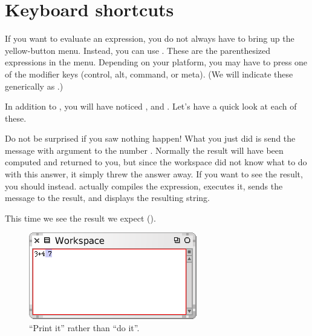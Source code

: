 \documentclass[a4paper,10pt,twoside]{book}
\begin{document}
\section{Keyboard shortcuts}

If you want  to evaluate an expression, you do not always have to bring up the yellow-button menu. Instead, you can use . These are the parenthesized expressions in the menu.  Depending on your platform, you may have to press one of the modifier keys (control, alt, command, or meta).
(We will indicate these generically as .)


In addition to , you will have noticed ,  and . Let's have a quick look at each of these.


Do not be surprised if you saw nothing happen! What you just did is send the message \ct{+} with argument  to the number . Normally the result  will have been computed and returned to you, but since the workspace did not know what to do with this answer, it simply threw the answer away.  If you want to see the result, you should  instead.  actually compiles the expression, executes it, sends the message  to the result, and displays the resulting string.

This time we see the result we expect ().

\begin{figure}[htb]
\centerline {\includegraphics[scale=0.7]{PrintIt}}
\caption{``Print it'' rather than ``do it''. \label{fig:printit}}
\end{figure}
\end{document}
